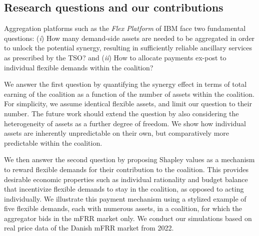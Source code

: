 \documentclass[conference]{IEEEtran}
\begin{document}
\subsection{Research questions and our contributions}
\vspace{-1mm}
Aggregation platforms such as the \textit{Flex Platform} of IBM face two fundamental questions: (\textit{i}) How many demand-side assets are needed to be aggregated in order to unlock the potential synergy, resulting in sufficiently reliable ancillary services as prescribed by the TSO? and (\textit{ii}) How to allocate payments ex-post to individual flexible demands within the coalition?

We answer the first question by quantifying the synergy effect in terms of total earning of the coalition as a function of the number of assets within the coalition. For simplicity, we assume identical flexible assets, and limit our question to their number. The future work should extend the question by also considering the heterogeneity of assets as a further degree of freedom. We show how individual assets are inherently unpredictable on their own, but comparatively more predictable within the coalition.

We then answer the second question by proposing Shapley values \cite{shapley1997value} as a mechanism to reward flexible demands for their contribution to the coalition. This provides desirable economic properties such as individual rationality and budget balance that incentivize flexible demands to stay in the coalition, as opposed to acting individually. We illustrate this payment mechanism using a stylized example of five flexible demands, each with numerous assets, in a coalition, for which the aggregator bids in the mFRR market only. We conduct our simulations based on real price data of the Danish mFRR market from 2022.




\end{document}
